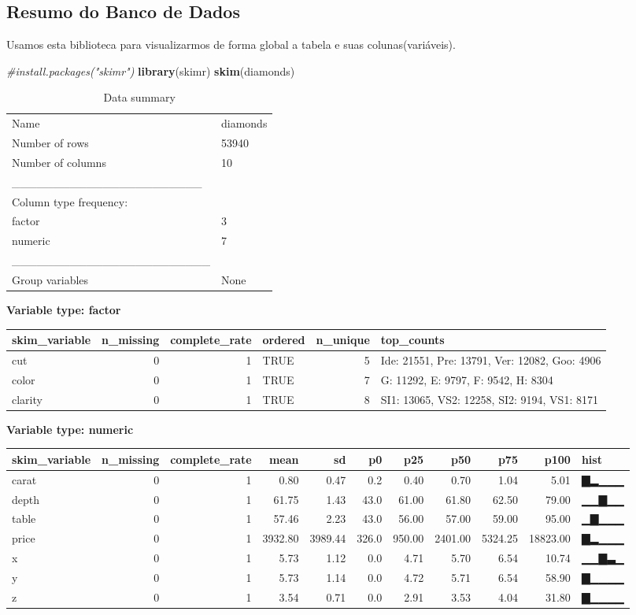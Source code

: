 \documentclass[
]{article}
\newenvironment{Shaded}{\begin{snugshade}}{\end{snugshade}}
\newcommand{\CommentTok}[1]{\textcolor[rgb]{0.56,0.35,0.01}{\textit{#1}}}
\newcommand{\KeywordTok}[1]{\textcolor[rgb]{0.13,0.29,0.53}{\textbf{#1}}}
\newcommand{\NormalTok}[1]{#1}
\begin{document}
\hypertarget{resumo-do-banco-de-dados}{%
\subsection{Resumo do Banco de Dados}\label{resumo-do-banco-de-dados}}

Usamos esta biblioteca para visualizarmos de forma global a tabela e
suas colunas(variáveis).

\begin{Shaded}
\begin{Highlighting}[]
\CommentTok{#install.packages("skimr")}
\KeywordTok{library}\NormalTok{(skimr)}
\KeywordTok{skim}\NormalTok{(diamonds)}
\end{Highlighting}
\end{Shaded}

\begin{longtable}[]{@{}ll@{}}
\caption{Data summary}\tabularnewline
\toprule
\endhead
Name & diamonds\tabularnewline
Number of rows & 53940\tabularnewline
Number of columns & 10\tabularnewline
\_\_\_\_\_\_\_\_\_\_\_\_\_\_\_\_\_\_\_\_\_\_\_ &\tabularnewline
Column type frequency: &\tabularnewline
factor & 3\tabularnewline
numeric & 7\tabularnewline
\_\_\_\_\_\_\_\_\_\_\_\_\_\_\_\_\_\_\_\_\_\_\_\_ &\tabularnewline
Group variables & None\tabularnewline
\bottomrule
\end{longtable}

\textbf{Variable type: factor}

\begin{longtable}[]{@{}lrrlrl@{}}
\toprule
skim\_variable & n\_missing & complete\_rate & ordered & n\_unique &
top\_counts\tabularnewline
\midrule
\endhead
cut & 0 & 1 & TRUE & 5 & Ide: 21551, Pre: 13791, Ver: 12082, Goo:
4906\tabularnewline
color & 0 & 1 & TRUE & 7 & G: 11292, E: 9797, F: 9542, H:
8304\tabularnewline
clarity & 0 & 1 & TRUE & 8 & SI1: 13065, VS2: 12258, SI2: 9194, VS1:
8171\tabularnewline
\bottomrule
\end{longtable}

\textbf{Variable type: numeric}

\begin{longtable}[]{@{}lrrrrrrrrrl@{}}
\toprule
skim\_variable & n\_missing & complete\_rate & mean & sd & p0 & p25 &
p50 & p75 & p100 & hist\tabularnewline
\midrule
\endhead
carat & 0 & 1 & 0.80 & 0.47 & 0.2 & 0.40 & 0.70 & 1.04 & 5.01 &
▇▂▁▁▁\tabularnewline
depth & 0 & 1 & 61.75 & 1.43 & 43.0 & 61.00 & 61.80 & 62.50 & 79.00 &
▁▁▇▁▁\tabularnewline
table & 0 & 1 & 57.46 & 2.23 & 43.0 & 56.00 & 57.00 & 59.00 & 95.00 &
▁▇▁▁▁\tabularnewline
price & 0 & 1 & 3932.80 & 3989.44 & 326.0 & 950.00 & 2401.00 & 5324.25 &
18823.00 & ▇▂▁▁▁\tabularnewline
x & 0 & 1 & 5.73 & 1.12 & 0.0 & 4.71 & 5.70 & 6.54 & 10.74 &
▁▁▇▃▁\tabularnewline
y & 0 & 1 & 5.73 & 1.14 & 0.0 & 4.72 & 5.71 & 6.54 & 58.90 &
▇▁▁▁▁\tabularnewline
z & 0 & 1 & 3.54 & 0.71 & 0.0 & 2.91 & 3.53 & 4.04 & 31.80 &
▇▁▁▁▁\tabularnewline
\bottomrule
\end{longtable}
\end{document}
